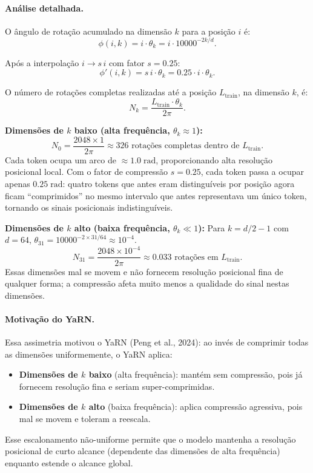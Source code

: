 \documentclass{dlproblemset}
\begin{document}
\paragraph{Análise detalhada.}

O ângulo de rotação acumulado na dimensão $k$ para a posição $i$ é:
\[
  \phi(i,k) = i \cdot \theta_k = i \cdot 10000^{-2k/d}.
\]

Após a interpolação $i \to s\,i$ com fator $s = 0.25$:
\[
  \phi'(i,k) = s\,i \cdot \theta_k = 0.25 \cdot i \cdot \theta_k.
\]

O número de rotações completas realizadas até a posição $L_{\mathrm{train}}$, na
dimensão $k$, é:
\[
  N_k = \frac{L_{\mathrm{train}} \cdot \theta_k}{2\pi}.
\]

\textbf{Dimensões de $k$ baixo (alta frequência, $\theta_k \approx 1$):}
\[
  N_0 = \frac{2048 \times 1}{2\pi} \approx 326 \text{ rotações completas dentro de } L_{\mathrm{train}}.
\]
Cada token ocupa um arco de $\approx 1.0\;\mathrm{rad}$, proporcionando
alta resolução posicional local. Com o fator de compressão $s = 0.25$, cada token
passa a ocupar apenas $0.25\;\mathrm{rad}$: quatro tokens que antes eram
distinguíveis por posição agora ficam ``comprimidos'' no mesmo intervalo que antes
representava um único token, tornando os sinais posicionais indistinguíveis.

\textbf{Dimensões de $k$ alto (baixa frequência, $\theta_k \ll 1$):}
Para $k = d/2 - 1$ com $d = 64$, $\theta_{31} = 10000^{-2\times31/64} \approx 10^{-4}$.
\[
  N_{31} = \frac{2048 \times 10^{-4}}{2\pi} \approx 0.033 \text{ rotações em } L_{\mathrm{train}}.
\]
Essas dimensões mal se movem e não fornecem resolução posicional fina de qualquer
forma; a compressão afeta muito menos a qualidade do sinal nestas dimensões.

\paragraph{Motivação do YaRN.}
Essa assimetria motivou o YaRN (Peng et al., 2024): ao invés de comprimir todas as
dimensões uniformemente, o YaRN aplica:
\begin{itemize}
  \item \textbf{Dimensões de $k$ baixo} (alta frequência): mantém sem compressão,
        pois já fornecem resolução fina e seriam super-comprimidas.
  \item \textbf{Dimensões de $k$ alto} (baixa frequência): aplica compressão
        agressiva, pois mal se movem e toleram a reescala.
\end{itemize}
Esse escalonamento não-uniforme permite que o modelo mantenha a resolução posicional
de curto alcance (dependente das dimensões de alta frequência) enquanto estende o
alcance global.
\end{document}
